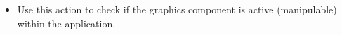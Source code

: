 \begin{itemize}
\item Use this action to check if the graphics component is active (manipulable) within the application.
\end{itemize}
